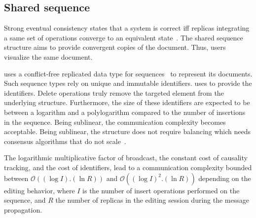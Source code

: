 

\subsection{Shared sequence}

Strong eventual consistency states that a system is correct iff replicas
integrating a same set of operations converge to an equivalent
state~\cite{shapiro2011comprehensive}. The shared sequence structure aims to
provide convergent copies of the document. Thus, users visualize the same
document.

\CRATE uses a conflict-free replicated data type for
sequences~\cite{shapiro2011conflict} to represent its documents. Such sequence
types rely on unique and immutable identifiers. \CRATE uses \LSEQ to provide the
identifiers. Delete operations truly remove the targeted element from the
underlying structure. Furthermore, the size of these identifiers are expected to
be between a logarithm and a polylogarithm compared to the number of insertions
in the sequence. Being sublinear, the communication complexity becomes
acceptable. Being sublinear, the structure does not require balancing which
needs consensus algorithms that do not scale~\cite{mostefaoui2015signature}.


The logarithmic multiplicative factor of broadcast, the constant cost of
causality tracking, and the cost of identifiers, lead to a communication
complexity bounded between $\mathcal{O}((\log I).(\ln R))$ and
$\mathcal{O}((\log I)^2.(\ln R))$ depending on the editing behavior, where $I$
is the number of insert operations performed on the sequence, and $R$ the number
of replicas in the editing session during the message propagation.

